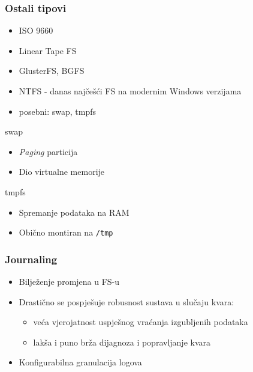 \documentclass[t]{beamer}
\begin{document}
\begin{frame}
	\frametitle{Ostali tipovi}
    \begin{itemize}
        \item ISO 9660
        \item Linear Tape FS
        \item GlusterFS, BGFS
		\item NTFS - danas najčešći FS na modernim Windows verzijama
        \item posebni: swap, tmpfs
    \end{itemize}

    swap
	\begin{itemize}
		\item \emph{Paging} particija
		\item Dio virtualne memorije
	\end{itemize}
	tmpfs
	\begin{itemize}
		\item Spremanje podataka na RAM
		\item Obično montiran na \texttt{/tmp}
	\end{itemize}
\end{frame}


\begin{frame}
	\frametitle{Journaling}
	\begin{itemize}
		\item Bilježenje promjena u FS-u
		\item Drastično se pospješuje robusnost sustava u slučaju kvara:
		\begin{itemize}
			\item veća vjerojatnost uspješnog vraćanja izgubljenih podataka
			\item lakša i puno brža dijagnoza i popravljanje kvara
		\end{itemize}
		\item Konfigurabilna granulacija logova
	\end{itemize}
\end{frame}
\end{document}
